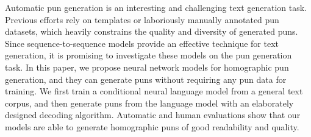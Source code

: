 Automatic pun generation is an interesting and challenging text generation task. Previous efforts rely on templates or laboriously manually annotated pun datasets, which heavily constrains the quality and diversity of generated puns. Since sequence-to-sequence models provide an effective technique for text generation, it is promising to investigate these models on the pun generation task. In this paper, we propose neural network models for homographic pun generation, and they can generate puns without requiring any pun data for training. We first train a conditional neural language model from a general text corpus, and then generate puns from the language model with an elaborately designed decoding algorithm. Automatic and human evaluations show that our models are able to generate homographic puns of good readability and quality.
